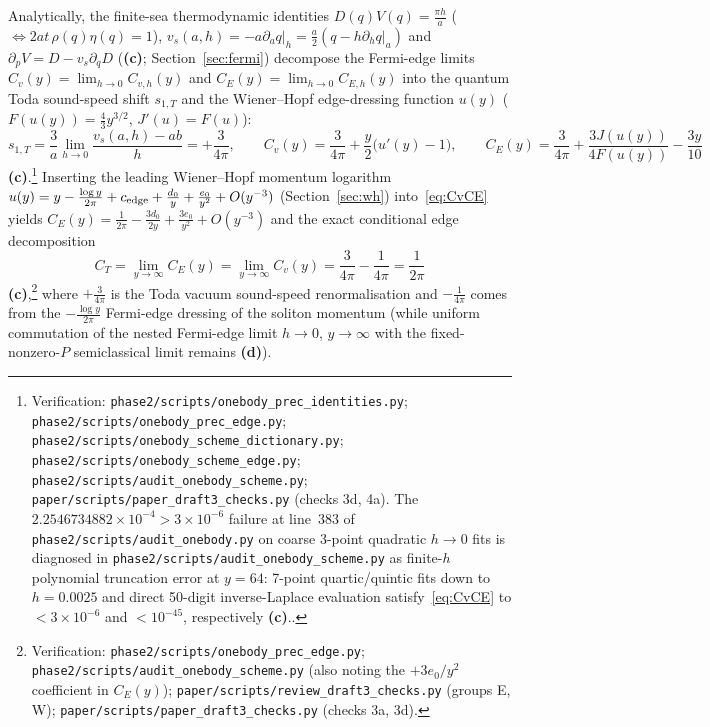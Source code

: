 \documentclass[11pt,a4paper]{article}
\newcommand{\lab}[1]{{\normalfont\sffamily\footnotesize\bfseries(#1)}}
\newcommand{\Lc}{\lab{c}}
\newcommand{\Ld}{\lab{d}}
\newcommand{\scr}[1]{\nolinkurl{#1}}
\newcommand{\chk}[1]{\footnote{\raggedright Verification: #1.}}
\theoremstyle{remark}
\begin{document}
Analytically, the finite-sea thermodynamic identities $D(q)V(q)=\frac{\pi h}{a}$ ($\Longleftrightarrow 2at\,\rho(q)\eta(q)=1$), $v_s(a,h)=-a\partial_aq|_h=\frac a2(q-h\partial_hq|_a)$ and $\partial_pV=D-v_s\partial_qD$ (\Lc; Section~\ref{sec:fermi}) decompose the Fermi-edge limits $C_v(y)=\lim_{h\to0}C_{v,h}(y)$ and $C_E(y)=\lim_{h\to0}C_{E,h}(y)$ into the quantum Toda sound-speed shift $s_{1,T}$ and the Wiener--Hopf edge-dressing function $u(y)$ ($F(u(y))=\tfrac43y^{3/2}$, $J'(u)=F(u)$):
\begin{equation}\label{eq:CvCE}
s_{1,T}=\frac3a\lim_{h\to0}\frac{v_s(a,h)-ab}{h}=+\frac3{4\pi},\qquad
C_v(y)=\frac3{4\pi}+\frac y2\big(u'(y)-1\big),\qquad
C_E(y)=\frac3{4\pi}+\frac{3J(u(y))}{4F(u(y))}-\frac{3y}{10}
\end{equation}
\Lc.\chk{\scr{phase2/scripts/onebody_prec_identities.py}; \scr{phase2/scripts/onebody_prec_edge.py}; \scr{phase2/scripts/onebody_scheme_dictionary.py}; \scr{phase2/scripts/onebody_scheme_edge.py}; \scr{phase2/scripts/audit_onebody_scheme.py}; \scr{paper/scripts/paper_draft3_checks.py} (checks 3d, 4a). The $2.2546734882\times10^{-4}>3\times10^{-6}$ failure at line~383 of \scr{phase2/scripts/audit_onebody.py} on coarse 3-point quadratic $h\to0$ fits is diagnosed in \scr{phase2/scripts/audit_onebody_scheme.py} as finite-$h$ polynomial truncation error at $y=64$: 7-point quartic/quintic fits down to $h=0.0025$ and direct 50-digit inverse-Laplace evaluation satisfy~\eqref{eq:CvCE} to $<3\times10^{-6}$ and $<10^{-45}$, respectively \Lc.}
Inserting the leading Wiener--Hopf momentum logarithm $u(y)=y-\frac{\log y}{2\pi}+c_{\rm edge}+\frac{d_0}{y}+\frac{e_0}{y^2}+O(y^{-3})$ (Section~\ref{sec:wh}) into~\eqref{eq:CvCE} yields $C_E(y)=\frac1{2\pi}-\frac{3d_0}{2y}+\frac{3e_0}{y^2}+O(y^{-3})$ and the exact conditional edge decomposition
\begin{equation}\label{eq:CTdecomp}
C_T=\lim_{y\to\infty}C_E(y)=\lim_{y\to\infty}C_v(y)=\frac3{4\pi}-\frac1{4\pi}=\frac1{2\pi}
\end{equation}
\Lc,\chk{\scr{phase2/scripts/onebody_prec_edge.py}; \scr{phase2/scripts/audit_onebody_scheme.py} (also noting the $+3e_0/y^2$ coefficient in $C_E(y)$); \scr{paper/scripts/review_draft3_checks.py} (groups E, W); \scr{paper/scripts/paper_draft3_checks.py} (checks 3a, 3d)} where $+\frac3{4\pi}$ is the Toda vacuum sound-speed renormalisation and $-\frac1{4\pi}$ comes from the $-\frac{\log y}{2\pi}$ Fermi-edge dressing of the soliton momentum (while uniform commutation of the nested Fermi-edge limit $h\to0$, $y\to\infty$ with the fixed-nonzero-$P$ semiclassical limit remains \Ld).
\end{document}
